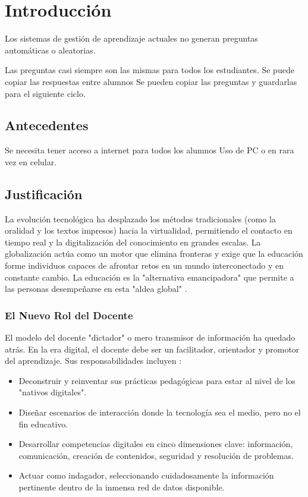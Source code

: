
\chapter{Introducción}
\label{ch:introduccion}

Los sistemas de gestión de aprendizaje actuales no generan preguntas
automáticas o aleatorias.

Las preguntas casi siempre son las mismas para todos los estudiantes.
Se puede copiar las respuestas entre alumnos
Se pueden copiar las preguntas y guardarlas para el siguiente ciclo.

\section{Antecedentes}

Se necesita tener acceso a internet para todos los alumnos
Uso de PC o en rara vez en celular.

\section{Justificación}

La evolución tecnológica ha desplazado los métodos tradicionales
(como la oralidad y los textos impresos) hacia la virtualidad,
permitiendo el contacto en tiempo real y la digitalización del
conocimiento en grandes escalas. La globalización actúa como un
motor que elimina fronteras y exige que la educación forme
individuos capaces de afrontar retos en un mundo interconectado
y en constante cambio. La educación es la "alternativa emancipadora"
que permite a las personas desempeñarse en esta "aldea global"
\cite{el_rol_doc}.

\subsection{El Nuevo Rol del Docente}

El modelo del docente "dictador" o mero transmisor de información
ha quedado atrás. En la era digital, el docente debe ser un
facilitador, orientador y promotor del aprendizaje. Sus
responsabilidades incluyen \cite{el_rol_doc}:

\begin{itemize}
  \item Deconstruir y reinventar sus prácticas pedagógicas para
    estar al nivel de los "nativos digitales".
  \item Diseñar escenarios de interacción donde la tecnología
    sea el medio, pero no el fin educativo.
  \item Desarrollar competencias digitales en cinco dimensiones
    clave: información, comunicación, creación de contenidos,
    seguridad y resolución de problemas.
  \item Actuar como indagador, seleccionando cuidadosamente la
    información pertinente dentro de la inmensa red de datos disponible.
\end{itemize}

